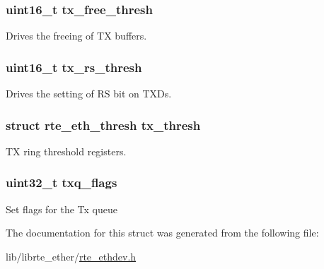 \subsubsection[{tx\+\_\+free\+\_\+thresh}]{\setlength{\rightskip}{0pt plus 5cm}uint16\+\_\+t tx\+\_\+free\+\_\+thresh}\label{structrte__eth__txconf_ad81b9d171a4d05802d179b0708f0c637}
Drives the freeing of T\+X buffers. \hypertarget{structrte__eth__txconf_ab7d7dbc33adbb1740718c9a841555dce}{}
\subsubsection[{tx\+\_\+rs\+\_\+thresh}]{\setlength{\rightskip}{0pt plus 5cm}uint16\+\_\+t tx\+\_\+rs\+\_\+thresh}\label{structrte__eth__txconf_ab7d7dbc33adbb1740718c9a841555dce}
Drives the setting of R\+S bit on T\+X\+Ds. \hypertarget{structrte__eth__txconf_a9644ade07686ec4825d4b7d45f3d6902}{}
\subsubsection[{tx\+\_\+thresh}]{\setlength{\rightskip}{0pt plus 5cm}struct {\bf rte\+\_\+eth\+\_\+thresh} tx\+\_\+thresh}\label{structrte__eth__txconf_a9644ade07686ec4825d4b7d45f3d6902}
T\+X ring threshold registers. \hypertarget{structrte__eth__txconf_a80d79f1953993347e9b0312a2096f86e}{}
\subsubsection[{txq\+\_\+flags}]{\setlength{\rightskip}{0pt plus 5cm}uint32\+\_\+t txq\+\_\+flags}\label{structrte__eth__txconf_a80d79f1953993347e9b0312a2096f86e}
Set flags for the Tx queue 

The documentation for this struct was generated from the following file\+:\begin{DoxyCompactItemize}
\item 
lib/librte\+\_\+ether/\hyperlink{rte__ethdev_8h}{rte\+\_\+ethdev.\+h}\end{DoxyCompactItemize}
